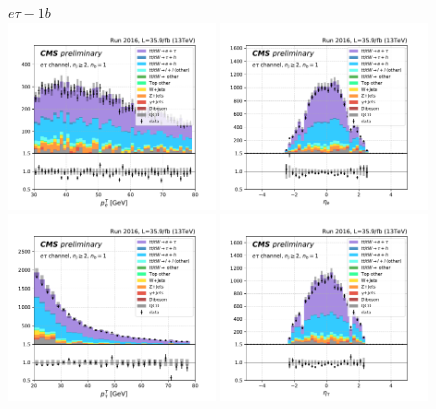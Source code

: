 \begin{figure}[ht]
    \centering
    $e\tau - 1b$ \\
    \includegraphics[width=0.49\textwidth]{chapters/Analysis/sectionPlots/figures/kinematics_pickles/etau/1b/etau_1b_lepton1_pt.pdf}
    \includegraphics[width=0.49\textwidth]{chapters/Analysis/sectionPlots/figures/kinematics_pickles/etau/1b/etau_1b_lepton1_eta.pdf}
    \includegraphics[width=0.49\textwidth]{chapters/Analysis/sectionPlots/figures/kinematics_pickles/etau/1b/etau_1b_lepton2_pt.pdf}
    \includegraphics[width=0.49\textwidth]{chapters/Analysis/sectionPlots/figures/kinematics_pickles/etau/1b/etau_1b_lepton2_eta.pdf}

\end{figure}

